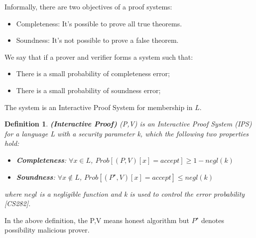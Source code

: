 \documentclass[twoside]{article}
\renewcommand{\cite}[1]{[#1]}
\newtheorem{definition}[theorem]{Definition}
\begin{document}
Informally, there are two objectives of a proof systems:

\begin{itemize}
\item Completeness: It's possible to prove all true theorems.
\item Soundness: It's not possible to prove a false theorem.
\end{itemize}

We say that if a prover and verifier forms a system such that:
\begin{itemize}
\item  There is a small probability of completeness error;
\item There is a small probability of soundness error;
\end{itemize}
The system is an Interactive Proof System for membership in $L$.


\begin{definition}\textbf{(Interactive Proof)} (P,V) is an Interactive Proof System (IPS) for a language L with a security parameter k, which the following two properties
hold:
\begin{itemize}
\item  \textbf{Completeness}: $\forall  x \in L$, $Prob [ (P,V) [x] = accept] \geq 1-negl(k)$ 
\item \textbf{Soundness}: $\forall  x  \notin L$, $Prob [ (P^{\star},V) [x] = accept] \leq negl(k)$ 
\end{itemize}
where $negl$ is a negligible function and k is used to control the error probability \cite{CS282}. 
\end{definition}
In the above definition, the P,V means honest algorithm but $P^\star$ denotes   possibility malicious prover.

\end{document}
